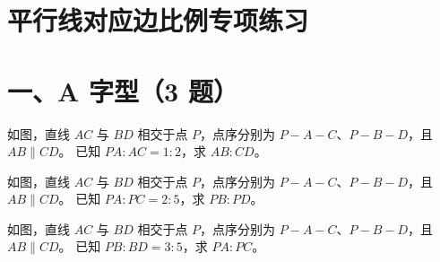 \documentclass{exam-zh}
\begin{document}
\section*{平行线对应边比例专项练习}

\section*{一、A 字型（3 题）}


\begin{problem}[points=10]
    如图，直线 $AC$ 与 $BD$ 相交于点 $P$，点序分别为 $P-A-C$、$P-B-D$，且 $AB\parallel CD$。
已知 $PA:AC=1:2$，求 $AB:CD$。


  \answerarea[38mm]
\end{problem}



\begin{problem}[points=10]
  \noindent
  \begin{minipage}[t]{\dimexpr\linewidth-60mm-6mm\relax}
    \vspace{0pt}
    如图，直线 $AC$ 与 $BD$ 相交于点 $P$，点序分别为 $P-A-C$、$P-B-D$，且 $AB\parallel CD$。
已知 $PA:PC=2:5$，求 $PB:PD$。


  \end{minipage}\hfill
  \begin{diagramcoltikz}{60mm}{第 2 题图}
  }
  \end{diagramcoltikz}
  \par\medskip
  \answerarea[38mm]
\end{problem}



\begin{problem}[points=10]
  \noindent
  \begin{minipage}[t]{\dimexpr\linewidth-60mm-6mm\relax}
    \vspace{0pt}
    如图，直线 $AC$ 与 $BD$ 相交于点 $P$，点序分别为 $P-A-C$、$P-B-D$，且 $AB\parallel CD$。
已知 $PB:BD=3:5$，求 $PA:PC$。


  \end{minipage}\hfill
  \begin{diagramcoltikz}{60mm}{第 3 题图}
  }
  \end{diagramcoltikz}
  \par\medskip
  \answerarea[38mm]
\end{problem}
\end{document}
